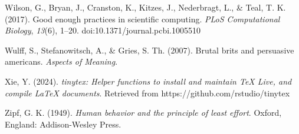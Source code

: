 \documentclass[
  letterpaper,
  krantz1]{latex/krantz-mod}
\newlength{\cslhangindent}
\newenvironment{CSLReferences}[2] %
 {\begin{list}{}{%
  \setlength{\itemindent}{0pt}
  \setlength{\leftmargin}{0pt}
  \setlength{\parsep}{0pt}
  \ifodd #1
   \setlength{\leftmargin}{\cslhangindent}
   \setlength{\itemindent}{-1\cslhangindent}
  \fi
  \setlength{\itemsep}{#2\baselineskip}}}
 {\end{list}}
\theoremstyle{definition}
\theoremstyle{definition}
\theoremstyle{remark}
\begin{document}
\begin{CSLReferences}{1}{0}
Wilson, G., Bryan, J., Cranston, K., Kitzes, J., Nederbragt, L., \&
Teal, T. K. (2017). Good enough practices in scientific computing.
\emph{PLoS Computational Biology}, \emph{13}(6), 1--20.
doi:10.1371/journal.pcbi.1005510

Wulff, S., Stefanowitsch, A., \& Gries, S. Th. (2007). Brutal brits and
persuasive americans. \emph{Aspects of Meaning}.

Xie, Y. (2024). \emph{{tinytex}: Helper functions to install and
maintain {T}eX {L}ive, and compile {LaTeX} documents}. Retrieved from
https://github.com/rstudio/tinytex

Zipf, G. K. (1949). \emph{Human behavior and the principle of least
effort}. Oxford, England: Addison-Wesley Press.

\end{CSLReferences}



\printindex
\end{document}
